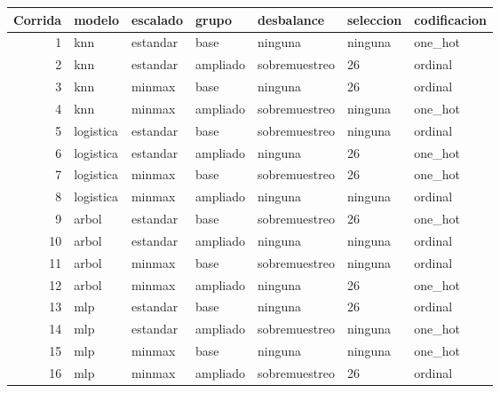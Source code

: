 \begin{tabular}{rllllll}
\toprule
Corrida & modelo & escalado & grupo & desbalance & seleccion & codificacion \\
\midrule
1 & knn & estandar & base & ninguna & ninguna & one\_hot \\
2 & knn & estandar & ampliado & sobremuestreo & 26 & ordinal \\
3 & knn & minmax & base & ninguna & 26 & ordinal \\
4 & knn & minmax & ampliado & sobremuestreo & ninguna & one\_hot \\
5 & logistica & estandar & base & sobremuestreo & ninguna & ordinal \\
6 & logistica & estandar & ampliado & ninguna & 26 & one\_hot \\
7 & logistica & minmax & base & sobremuestreo & 26 & one\_hot \\
8 & logistica & minmax & ampliado & ninguna & ninguna & ordinal \\
9 & arbol & estandar & base & sobremuestreo & 26 & one\_hot \\
10 & arbol & estandar & ampliado & ninguna & ninguna & ordinal \\
11 & arbol & minmax & base & sobremuestreo & ninguna & ordinal \\
12 & arbol & minmax & ampliado & ninguna & 26 & one\_hot \\
13 & mlp & estandar & base & ninguna & 26 & ordinal \\
14 & mlp & estandar & ampliado & sobremuestreo & ninguna & one\_hot \\
15 & mlp & minmax & base & ninguna & ninguna & one\_hot \\
16 & mlp & minmax & ampliado & sobremuestreo & 26 & ordinal \\
\bottomrule
\end{tabular}
